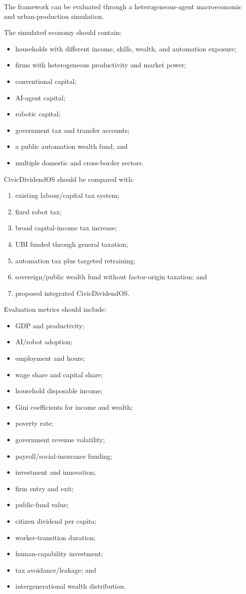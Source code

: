 \documentclass[conference]{IEEEtran}
\begin{document}
The framework can be evaluated through a heterogeneous-agent macroeconomic and
urban-production simulation.

The simulated economy should contain:

\begin{itemize}
\item households with different income, skills, wealth, and automation exposure;
\item firms with heterogeneous productivity and market power;
\item conventional capital;
\item AI-agent capital;
\item robotic capital;
\item government tax and transfer accounts;
\item a public automation wealth fund; and
\item multiple domestic and cross-border sectors.
\end{itemize}

CivicDividendOS should be compared with:

\begin{enumerate}
\item existing labour/capital tax system;
\item fixed robot tax;
\item broad capital-income tax increase;
\item UBI funded through general taxation;
\item automation tax plus targeted retraining;
\item sovereign/public wealth fund without factor-origin taxation; and
\item proposed integrated CivicDividendOS.
\end{enumerate}

Evaluation metrics should include:

\begin{itemize}
\item GDP and productivity;
\item AI/robot adoption;
\item employment and hours;
\item wage share and capital share;
\item household disposable income;
\item Gini coefficients for income and wealth;
\item poverty rate;
\item government revenue volatility;
\item payroll/social-insurance funding;
\item investment and innovation;
\item firm entry and exit;
\item public-fund value;
\item citizen dividend per capita;
\item worker-transition duration;
\item human-capability investment;
\item tax avoidance/leakage; and
\item intergenerational wealth distribution.
\end{itemize}
\end{document}
